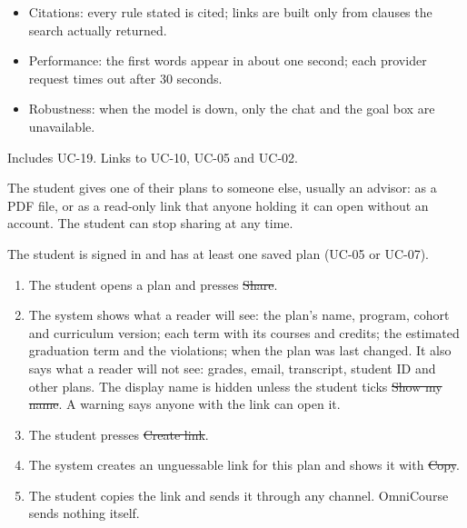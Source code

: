\begin{itemize}
  \item Citations: every rule stated is cited; links are built only from clauses the search actually returned.
  \item Performance: the first words appear in about one second; each provider request times out after 30 seconds.
  \item Robustness: when the model is down, only the chat and the goal box are unavailable.
\end{itemize}

Includes UC-19. Links to UC-10, UC-05 and UC-02.


The student gives one of their plans to someone else, usually an advisor: as a PDF file, or as a read-only link that
anyone holding it can open without an account. The student can stop sharing at any time.

The student is signed in and has at least one saved plan (UC-05 or UC-07).

\begin{enumerate}
  \item The student opens a plan and presses \st{Share}.
  \item The system shows what a reader will see: the plan's name, program, cohort and curriculum version; each term with
        its courses and credits; the estimated graduation term and the violations; when the plan was last changed. It also
        says what a reader will not see: grades, email, transcript, student ID and other plans. The display name is hidden
        unless the student ticks \st{Show my name}. A warning says anyone with the link can open it.
  \item The student presses \st{Create link}.
  \item The system creates an unguessable link for this plan and shows it with \st{Copy}.
  \item The student copies the link and sends it through any channel. OmniCourse sends nothing itself.
\end{enumerate}

